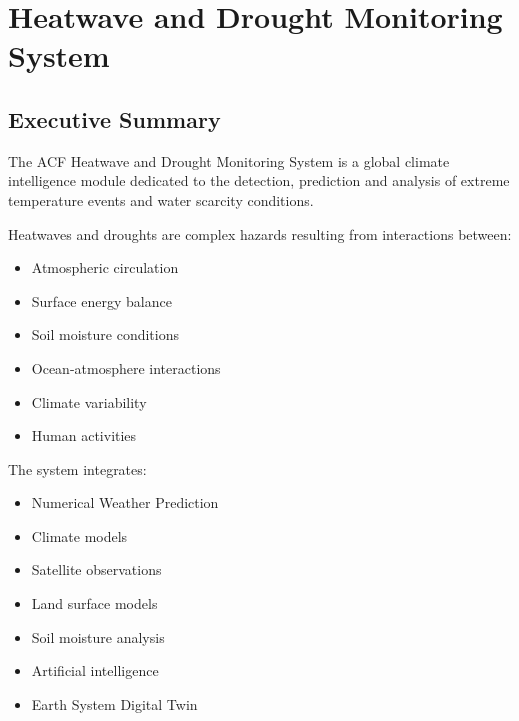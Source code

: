 
\section{Heatwave and Drought Monitoring System}

\subsection{Executive Summary}

The ACF Heatwave and Drought Monitoring System is a global climate
intelligence module dedicated to the detection, prediction and analysis
of extreme temperature events and water scarcity conditions.

Heatwaves and droughts are complex hazards resulting from interactions
between:

\begin{itemize}

\item Atmospheric circulation

\item Surface energy balance

\item Soil moisture conditions

\item Ocean-atmosphere interactions

\item Climate variability

\item Human activities

\end{itemize}


The system integrates:

\begin{itemize}

\item Numerical Weather Prediction

\item Climate models

\item Satellite observations

\item Land surface models

\item Soil moisture analysis

\item Artificial intelligence

\item Earth System Digital Twin

\end{itemize}


